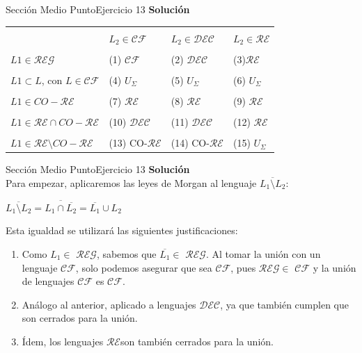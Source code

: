 \documentclass[10pt, envcountsect, presentation, aspectratio=169]{beamer}
\newcommand{\lreg}{\ensuremath{\mathcal {REG}}}
\newcommand{\ld}{\ensuremath{\mathcal {DEC}}}
\newcommand{\lr}{\ensuremath{\mathcal {RE}}}
\begin{document}
\begin{frame}{Sección Medio Punto}{Ejercicio 13}
    \textbf{Solución}\\
    \begin{table}[h]
             \begin{tabular}{|l|l|l|l|}
             \hline
             &&&\\
             &$L_2 \in \mathcal{CF}$ &$ L_2 \in \ld$ & $ L_2 \in \lr$\\
             \hline
             &&&\\
              $ L1 \in \lreg$&(1) $\mathcal{CF}$ &(2) \ld&(3)\lr\\
              \hline
             &&&\\
             $ L1 \subset L$, con $L \in \mathcal{CF}$&(4) $U_\Sigma$&(5) $U_\Sigma$&(6) $U_\Sigma$\\
              \hline
             &&&\\
             $L1 \in CO-\lr $&(7) \lr&(8) \lr&(9) \lr\\
              \hline
             &&&\\
             $L1 \in \lr \cap CO-\lr$&(10) \ld&(11) \ld&(12) \lr\\
              \hline
             &&&\\
             $ L1 \in \lr \setminus CO-\lr$&(13) CO-\lr &(14) CO-\lr&(15) $U_\Sigma$\\
              \hline
             \end{tabular}
        \end{table}
\end{frame}

\begin{frame}{Sección Medio Punto}{Ejercicio 13}
    \textbf{Solución}\\
    Para empezar, aplicaremos las leyes de Morgan al lenguaje $\overline{L_1 \setminus L_2}$:
    
    \begin{center}
        $\overline{L_1 \setminus L_2} = \overline{L_1 \cap \overline{L_2}}= \overline{L_1}\cup L_2 $
    \end{center}

    Esta igualdad se utilizará las siguientes justificaciones:
    
    \begin{enumerate}[(1)]
        \item Como $L_1 \in$ \lreg, sabemos que $\overline{L_1} \in$ \lreg. Al tomar la unión con un lenguaje $\mathcal{CF}$, solo podemos asegurar que sea $\mathcal{CF}$, pues \lreg $\in$ $\mathcal{CF}$ y la unión de lenguajes $\mathcal{CF}$ \space es $\mathcal{CF}$.
        \item Análogo al anterior, aplicado a lenguajes \ld, ya que también cumplen que son cerrados para la unión.
        \item Ídem, los lenguajes \lr \space son también cerrados para la unión.
    \end{enumerate}
\end{frame}
\end{document}
